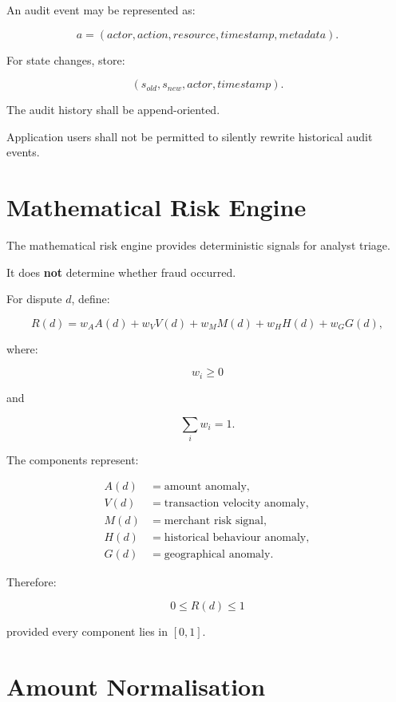 \documentclass[11pt,a4paper]{article}
\begin{document}
An audit event may be represented as:

\[
a =
(
actor,
action,
resource,
timestamp,
metadata
).
\]

For state changes, store:

\[
(s_{old},s_{new},actor,timestamp).
\]

The audit history shall be append-oriented.

Application users shall not be permitted to silently rewrite historical
audit events.

\section{Mathematical Risk Engine}

The mathematical risk engine provides deterministic signals for analyst
triage.

It does \textbf{not} determine whether fraud occurred.

For dispute \(d\), define:

\[
R(d)
=
w_A A(d)
+
w_V V(d)
+
w_M M(d)
+
w_H H(d)
+
w_G G(d),
\]

where:

\[
w_i\geq0
\]

and

\[
\sum_i w_i=1.
\]

The components represent:

\begin{align*}
A(d) &= \text{amount anomaly},\\
V(d) &= \text{transaction velocity anomaly},\\
M(d) &= \text{merchant risk signal},\\
H(d) &= \text{historical behaviour anomaly},\\
G(d) &= \text{geographical anomaly}.
\end{align*}

Therefore:

\[
0\leq R(d)\leq1
\]

provided every component lies in \([0,1]\).

\section{Amount Normalisation}
\end{document}
